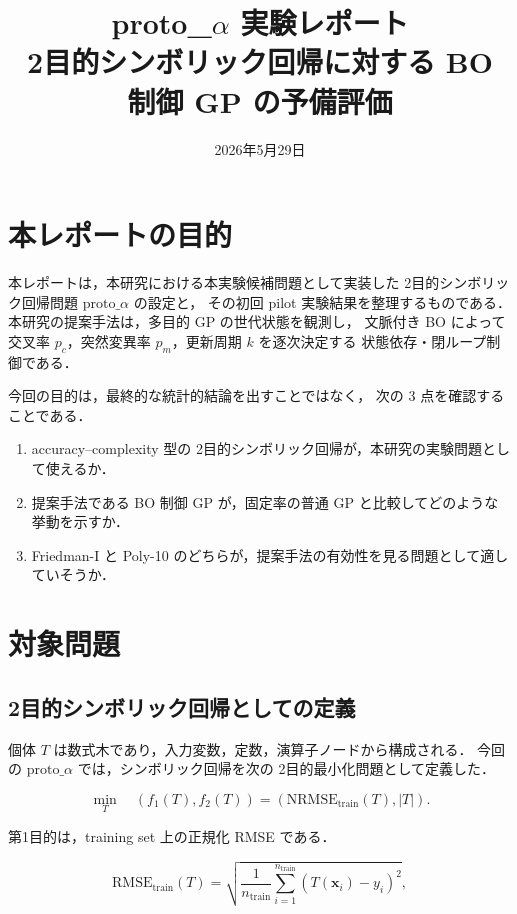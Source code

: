 \documentclass[a4paper,11pt]{ltjsarticle}
\title{proto\_\(\alpha\) 実験レポート\\2目的シンボリック回帰に対する BO 制御 GP の予備評価}
\author{}
\date{2026年5月29日}
\newcommand{\NRMSE}{\mathrm{NRMSE}}
\begin{document}
\maketitle

\section{本レポートの目的}

本レポートは，本研究における本実験候補問題として実装した
2目的シンボリック回帰問題 \(\mathrm{proto}\_\alpha\) の設定と，
その初回 pilot 実験結果を整理するものである．
本研究の提案手法は，多目的 GP の世代状態を観測し，
文脈付き BO によって交叉率 \(p_c\)，突然変異率 \(p_m\)，更新周期 \(k\) を逐次決定する
状態依存・閉ループ制御である．

今回の目的は，最終的な統計的結論を出すことではなく，
次の 3 点を確認することである．

\begin{enumerate}
  \item accuracy--complexity 型の 2目的シンボリック回帰が，本研究の実験問題として使えるか．
  \item 提案手法である BO 制御 GP が，固定率の普通 GP と比較してどのような挙動を示すか．
  \item Friedman-I と Poly-10 のどちらが，提案手法の有効性を見る問題として適していそうか．
\end{enumerate}

\section{対象問題}

\subsection{2目的シンボリック回帰としての定義}

個体 \(T\) は数式木であり，入力変数，定数，演算子ノードから構成される．
今回の \(\mathrm{proto}\_\alpha\) では，シンボリック回帰を次の 2目的最小化問題として定義した．

\[
  \min_T \quad
  \left(
    f_1(T), f_2(T)
  \right)
  =
  \left(
    \NRMSE_{\mathrm{train}}(T), |T|
  \right).
\]

第1目的は，training set 上の正規化 RMSE である．

\[
  \mathrm{RMSE}_{\mathrm{train}}(T)
  =
  \sqrt{
    \frac{1}{n_{\mathrm{train}}}
    \sum_{i=1}^{n_{\mathrm{train}}}
    \left(T(\bm{x}_i)-y_i\right)^2
  },
\]
\end{document}

